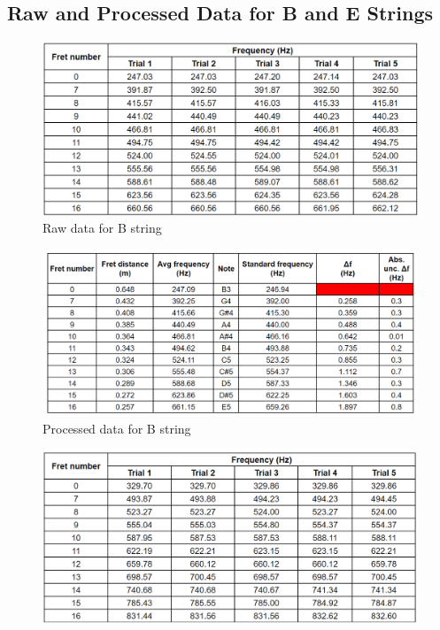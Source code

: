 \newpage
\begin{appendices}
    \section{Raw and Processed Data for B and E Strings}
        \begin{figure}[!htbp]
            \includegraphics[width = \textwidth]{ee/b string raw.png}
            \caption{Raw data for B string}
        \end{figure}
        \begin{figure}[!htbp]
            \includegraphics[width = \textwidth]{ee/b string prsd.png}
            \caption{Processed data for B string}
        \end{figure}
        \begin{figure}[!htbp]
            \includegraphics[width = \textwidth]{ee/e string raw.png}

\end{figure}
\end{appendices}
